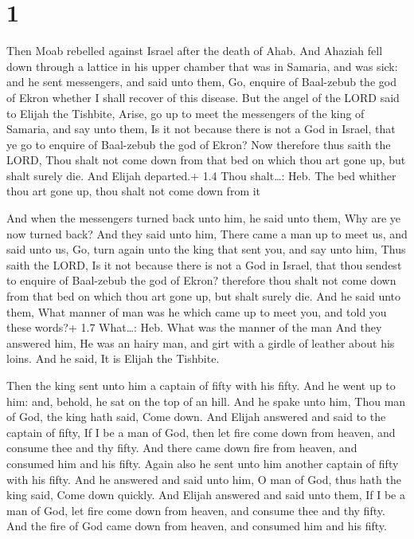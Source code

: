 \hypertarget{section}{%
\section{1}\label{section}}

 Then Moab rebelled against Israel after the death of Ahab.
 And Ahaziah fell down through a lattice in his upper
chamber that was in Samaria, and was sick: and he sent messengers, and
said unto them, Go, enquire of Baal-zebub the god of Ekron whether I
shall recover of this disease.  But the angel of the LORD
said to Elijah the Tishbite, Arise, go up to meet the messengers of the
king of Samaria, and say unto them, Is it not because there is not a God
in Israel, that ye go to enquire of Baal-zebub the god of Ekron?
 Now therefore thus saith the LORD, Thou shalt not come down
from that bed on which thou art gone up, but shalt surely die. And
Elijah departed.+ 1.4 Thou shalt\ldots: Heb. The bed whither thou art
gone up, thou shalt not come down from it

 And when the messengers turned back unto him, he said
unto them, Why are ye now turned back?  And they said unto
him, There came a man up to meet us, and said unto us, Go, turn again
unto the king that sent you, and say unto him, Thus saith the LORD, Is
it not because there is not a God in Israel, that thou sendest to
enquire of Baal-zebub the god of Ekron? therefore thou shalt not come
down from that bed on which thou art gone up, but shalt surely die.
 And he said unto them, What manner of man was he which came
up to meet you, and told you these words?+ 1.7 What\ldots: Heb. What was
the manner of the man  And they answered him, He was an
hairy man, and girt with a girdle of leather about his loins. And he
said, It is Elijah the Tishbite.

 Then the king sent unto him a captain of fifty with his
fifty. And he went up to him: and, behold, he sat on the top of an hill.
And he spake unto him, Thou man of God, the king hath said, Come down.
 And Elijah answered and said to the captain of fifty, If I
be a man of God, then let fire come down from heaven, and consume thee
and thy fifty. And there came down fire from heaven, and consumed him
and his fifty.  Again also he sent unto him another captain
of fifty with his fifty. And he answered and said unto him, O man of
God, thus hath the king said, Come down quickly.  And
Elijah answered and said unto them, If I be a man of God, let fire come
down from heaven, and consume thee and thy fifty. And the fire of God
came down from heaven, and consumed him and his fifty.

